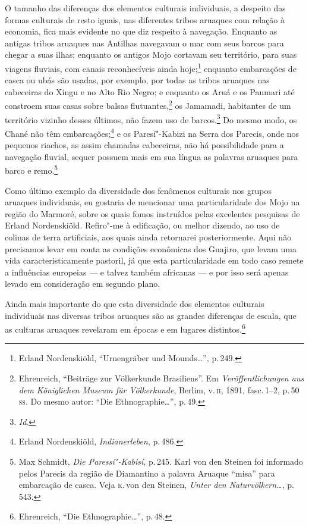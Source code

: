 O tamanho das diferenças dos elementos culturais individuais, a
despeito das formas culturais de resto iguais, nas diferentes tribos
aruaques com relação à economia, fica mais evidente no que diz respeito
à navegação. Enquanto as antigas tribos aruaques nas Antilhas navegavam
o mar com seus barcos para chegar a suas ilhas; enquanto os antigos Mojo
cortavam seu território, para suas viagens fluviais, com canais
reconhecíveis ainda hoje;\footnote{Erland Nordenskiöld, ``Urnengräber
  und Mounds\ldots'', p.\,249.} enquanto
embarcações de casca ou ubás são usadas, por exemplo, por todas as
tribos aruaques nas cabeceiras do Xingu e no Alto Rio Negro; e enquanto
os Aruá e os Paumari até constroem suas casas sobre balsas
flutuantes,\footnote{Ehrenreich, ``Beiträge zur Völkerkunde Brasiliens''.
  Em \textit{Veröffentlichungen aus dem Königlichen Museum für
  Völkerkunde}, Berlim, v.\,\textsc{ii}, 1891, fasc.\,1--2, p.\,50\,\textsc{ss}. Do mesmo
  autor: ``Die Ethnographie\ldots'', p.\,49.} os Jamamadi, habitantes de um
território vizinho desses últimos, não fazem uso de barcos.\footnote{\textit{Id}.} Do mesmo
modo, os Chané não têm embarcações;\footnote{Erland Nordenskiöld,
  \textit{Indianerleben}, p.\,486.} e os
Paresí"-Kabizi na Serra dos Parecis, onde nos pequenos riachos, as assim
chamadas cabeceiras, não há possibilidade para a navegação fluvial,
sequer possuem mais em sua língua as palavras aruaques para barco e
remo.\footnote{Max Schmidt, \textit{Die Paressí"-Kabisí}, p.\,245. Karl
  von den Steinen foi informado pelos Parecis da região de Diamantino a
  palavra Aruaque ``misa'' para embarcação de casca. Veja \textsc{k}.\,von den
  Steinen, \textit{Unter den Naturvölkern\ldots}, p.\,543.}

Como último exemplo da diversidade dos fenômenos culturais nos grupos
aruaques individuais, eu gostaria de mencionar uma particularidade dos
Mojo na região do Marmoré, sobre os quais fomos instruídos pelas
excelentes pesquisas de Erland Nordenskiöld. Refiro"-me à edificação, ou
melhor dizendo, ao uso de colinas de terra artificiais, aos quais ainda
retornarei posteriormente. Aqui não precisamos levar em conta as
condições econômicas dos Guajiro, que levam uma vida
caracteristicamente pastoril, já que esta particularidade em todo caso
remete a influências europeias --- e talvez também africanas --- e por
isso será apenas levado em consideração em segundo plano.

Ainda mais importante do que esta diversidade dos elementos culturais
individuais nas diversas tribos aruaques são as grandes diferenças de
escala, que as culturas aruaques revelaram em épocas e em lugares
distintos.\footnote{Ehrenreich, ``Die Ethnographie\ldots'', p.\,48.}


